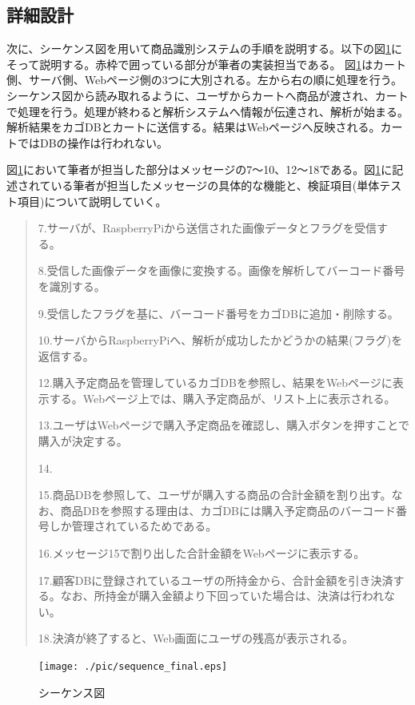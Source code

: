 \subsection*{詳細設計}
次に、シーケンス図を用いて商品識別システムの手順を説明する。以下の図\ref{sequence}にそって説明する。赤枠で囲っている部分が筆者の実装担当である。
図\ref{sequence}はカート側、サーバ側、Webページ側の3つに大別される。左から右の順に処理を行う。シーケンス図から読み取れるように、ユーザからカートへ商品が渡され、カートで処理を行う。処理が終わると解析システムへ情報が伝達され、解析が始まる。解析結果をカゴDBとカートに送信する。結果はWebページへ反映される。カートではDBの操作は行われない。

図\ref{sequence}において筆者が担当した部分はメッセージの7～10、12～18である。図\ref{sequence}に記述されている筆者が担当したメッセージの具体的な機能と、検証項目(単体テスト項目)について説明していく。


\begin{quote}

7.サーバが、RaspberryPiから送信された画像データとフラグを受信する。

8.受信した画像データを画像に変換する。画像を解析してバーコード番号を識別する。

9.受信したフラグを基に、バーコード番号をカゴDBに追加・削除する。

10.サーバからRaspberryPiへ、解析が成功したかどうかの結果(フラグ)を返信する。

12.購入予定商品を管理しているカゴDBを参照し、結果をWebページに表示する。Webページ上では、購入予定商品が、リスト上に表示される。

13.ユーザはWebページで購入予定商品を確認し、購入ボタンを押すことで購入が決定する。

14.

15.商品DBを参照して、ユーザが購入する商品の合計金額を割り出す。なお、商品DBを参照する理由は、カゴDBには購入予定商品のバーコード番号しか管理されているためである。

16.メッセージ15で割り出した合計金額をWebページに表示する。

17.顧客DBに登録されているユーザの所持金から、合計金額を引き決済する。なお、所持金が購入金額より下回っていた場合は、決済は行われない。

18.決済が終了すると、Web画面にユーザの残高が表示される。
\end{quote}

\begin{figure}[htbp]
\centering
\texttt{[image: ./pic/sequence\_final.eps]}
\caption{シーケンス図}
\label{sequence}
\end{figure}

